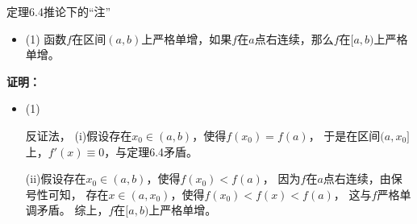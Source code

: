 \documentclass{article}
\begin{document}
\begin{zremark}
  定理6.4推论下的“注”
  \begin{itemize}
    \item
          (1) 函数$f$在区间$(a, b)$上严格单增，如果$f$在$a$点右连续，那么$f$在$[a, b)$上严格单增。
  \end{itemize}
\end{zremark}

\textbf{证明：}

\begin{itemize}
  \item (1)

        反证法，
        (i)假设存在$x_0 \in (a, b)$，使得$f(x_0) = f(a)$，
        于是在区间$(a, x_0]$上，$f'(x) \equiv 0$，与定理6.4矛盾。

        (ii)假设存在$x_0 \in (a, b)$，使得$f(x_0) < f(a)$，
        因为$f$在$a$点右连续，由保号性可知，
        存在$x \in (a, x_0)$，使得$f(x_0) < f(x) < f(a)$，
        这与$f$严格单调矛盾。
        综上，$f$在$[a, b)$上严格单增。

\end{itemize}
\end{document}
